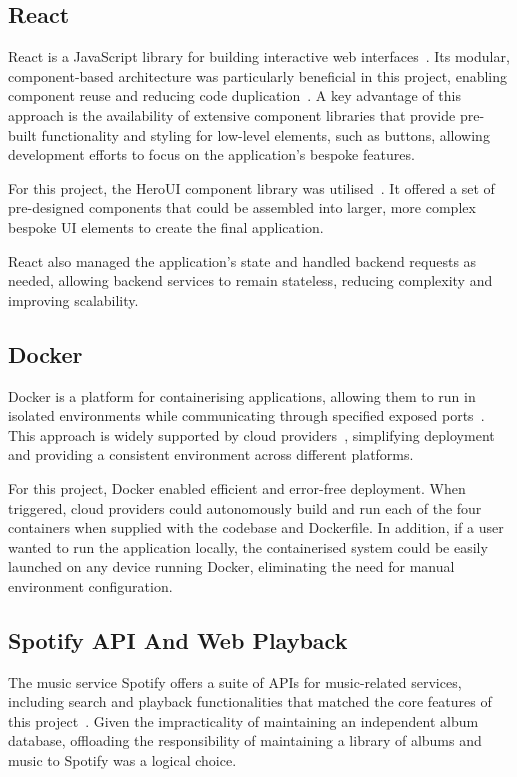 \subsection{React}
React is a JavaScript library for building interactive web interfaces~\cite{React}. Its modular, component-based architecture was particularly beneficial in this project, enabling component reuse and reducing code duplication~\cite{10638895}. A key advantage of this approach is the availability of extensive component libraries that provide pre-built functionality and styling for low-level elements, such as buttons, allowing development efforts to focus on the application's bespoke features.

For this project, the HeroUI component library was utilised~\cite{HeroUI}. It offered a set of pre-designed components that could be assembled into larger, more complex bespoke UI elements to create the final application.

React also managed the application's state and handled backend requests as needed, allowing backend services to remain stateless, reducing complexity and improving scalability.

\subsection{Docker}
Docker is a platform for containerising applications, allowing them to run in isolated environments while communicating through specified exposed ports~\cite{DockerDocs}. This approach is widely supported by cloud providers~\cite{AWSDocker,GoogleDocker}, simplifying deployment and providing a consistent environment across different platforms.

For this project, Docker enabled efficient and error-free deployment. When triggered, cloud providers could autonomously build and run each of the four containers when supplied with the codebase and Dockerfile. In addition, if a user wanted to run the application locally, the containerised system could be easily launched on any device running Docker, eliminating the need for manual environment configuration.

\subsection{Spotify API And Web Playback}
The music service Spotify offers a suite of APIs for music-related services, including search and playback functionalities that matched the core features of this project~\cite{SpotifyAPI}. Given the impracticality of maintaining an independent album database, offloading the responsibility of maintaining a library of albums and music to Spotify was a logical choice.

